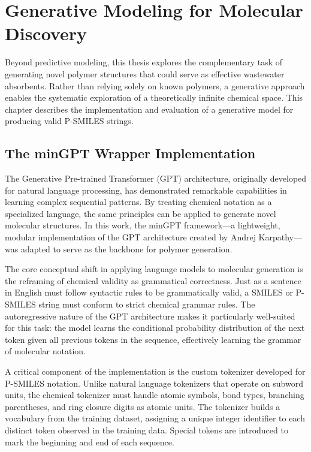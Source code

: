 \chapter{Generative Modeling for Molecular Discovery}
\label{sec:generative_chapter}

Beyond predictive modeling, this thesis explores the complementary task of generating novel polymer structures that could serve as effective wastewater absorbents. Rather than relying solely on known polymers, a generative approach enables the systematic exploration of a theoretically infinite chemical space. This chapter describes the implementation and evaluation of a generative model for producing valid P-SMILES strings.

\section{The minGPT Wrapper Implementation}
\label{sec:mingpt_wrapper}

The Generative Pre-trained Transformer (GPT) architecture, originally developed for natural language processing, has demonstrated remarkable capabilities in learning complex sequential patterns. By treating chemical notation as a specialized language, the same principles can be applied to generate novel molecular structures. In this work, the minGPT framework—a lightweight, modular implementation of the GPT architecture created by Andrej Karpathy—was adapted to serve as the backbone for polymer generation.

The core conceptual shift in applying language models to molecular generation is the reframing of chemical validity as grammatical correctness. Just as a sentence in English must follow syntactic rules to be grammatically valid, a SMILES or P-SMILES string must conform to strict chemical grammar rules. The autoregressive nature of the GPT architecture makes it particularly well-suited for this task: the model learns the conditional probability distribution of the next token given all previous tokens in the sequence, effectively learning the grammar of molecular notation.

A critical component of the implementation is the custom tokenizer developed for P-SMILES notation. Unlike natural language tokenizers that operate on subword units, the chemical tokenizer must handle atomic symbols, bond types, branching parentheses, and ring closure digits as atomic units. The tokenizer builds a vocabulary from the training dataset, assigning a unique integer identifier to each distinct token observed in the training data. Special tokens are introduced to mark the beginning and end of each sequence.

